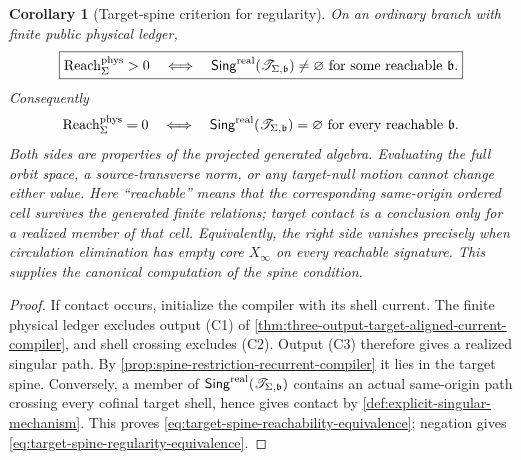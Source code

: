 \documentclass[11pt]{article}
\numberwithin{section}{part}
\theoremstyle{plain}
\newtheorem{corollary}[corollary]{Corollary}
\theoremstyle{definition}
\theoremstyle{remark}
\newcommand{\Reach}{\operatorname{Reach}}
\newcommand{\Spine}{\mathscr T}
\newcommand{\Phys}{\mathrm{phys}}
\begin{document}
\begin{corollary}[Target-spine criterion for regularity]
\label{cor:target-spine-regularity-criterion}
On an ordinary branch with finite public physical ledger,
\begin{equation}
 \label{eq:target-spine-reachability-equivalence}
 \boxed{
 \Reach_\Sigma^{\Phys}>0
 \quad\Longleftrightarrow\quad
 \mathsf{Sing}^{\rm real}
       (\Spine_{\Sigma,\mathfrak b})\ne\varnothing
 \text{ for some reachable }\mathfrak b .}
\end{equation}
Consequently
\begin{equation}
 \label{eq:target-spine-regularity-equivalence}
 \Reach_\Sigma^{\Phys}=0
 \quad\Longleftrightarrow\quad
 \mathsf{Sing}^{\rm real}
       (\Spine_{\Sigma,\mathfrak b})=\varnothing
 \text{ for every reachable }\mathfrak b .
\end{equation}
Both sides are properties of the projected generated algebra.  Evaluating
the full orbit space, a source-transverse norm, or any target-null motion
cannot change either value.  Here ``reachable'' means that the corresponding
same-origin ordered cell survives the generated finite relations; target
contact is a conclusion only for a realized member of that cell.
Equivalently, the right side vanishes precisely when circulation elimination
has empty core \(X_\infty\) on every reachable signature.  This supplies the
canonical computation of the spine condition.
\end{corollary}

\begin{proof}
If contact occurs, initialize the compiler with its shell current.  The
finite physical ledger excludes output \textup{(C1)} of
\cref{thm:three-output-target-aligned-current-compiler}, and shell crossing
excludes \textup{(C2)}.  Output \textup{(C3)} therefore gives a realized
singular path.  By \cref{prop:spine-restriction-recurrent-compiler} it lies in
the target spine.  Conversely, a member of
\(\mathsf{Sing}^{\rm real}(\Spine_{\Sigma,\mathfrak b})\) contains an actual
same-origin path crossing every cofinal target shell, hence gives contact by
\cref{def:explicit-singular-mechanism}.  This proves
\eqref{eq:target-spine-reachability-equivalence}; negation gives
\eqref{eq:target-spine-regularity-equivalence}.
\end{proof}
\end{document}
